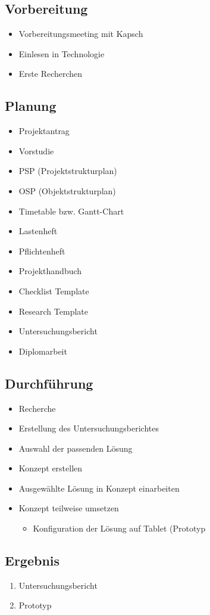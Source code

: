 \subsection{Vorbereitung}
\begin{itemize}
	\item Vorbereitungsmeeting mit Kapsch
	\item Einlesen in Technologie
	\item Erste Recherchen
\end{itemize}
\subsection{Planung}
\begin{itemize}
	\item Projektantrag
	\item Vorstudie
	\item PSP (Projektstrukturplan)
	\item OSP (Objektstrukturplan)
	\item Timetable bzw. Gantt-Chart
	\item Lastenheft
	\item Pflichtenheft
	\item Projekthandbuch
	\item Checklist Template
	\item Research Template
	\item Untersuchungsbericht
	\item Diplomarbeit
\end{itemize}
\subsection{Durchführung}
\begin{itemize}
	\item Recherche
	\item Erstellung des Untersuchungsberichtes
	\item Auswahl der passenden Lösung
	\item Konzept erstellen
	\item Ausgewählte Lösung in Konzept einarbeiten
	\item Konzept teilweise umsetzen
	\begin{itemize}
		\item Konfiguration der Lösung auf Tablet (Prototyp
	\end{itemize}
\end{itemize}
\subsection{Ergebnis}
\begin{enumerate}
	\item Untersuchungsbericht
	\item Prototyp
\end{enumerate}

